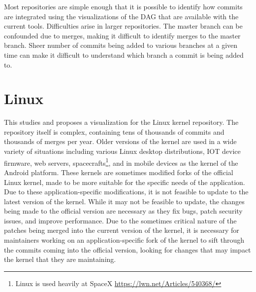 Most repositories are simple enough that it is possible to identify how
commits are integrated using the visualizations of the DAG that are
available with the current tools.
Difficulties arise in larger repositories.
The master branch can be confounded due to \foxtrot{}
merges, making it difficult to identify merges to the master branch.
Sheer number of commits being added to various branches at a given
time can make it difficult to understand which branch a commit is
being added to.

\section{Linux}\label{sec:linux}

This \paper{} studies and proposes a visualization for the Linux kernel
repository.
The repository itself is complex, containing tens of thousands of commits
and thousands of merges per year.
Older versions of the kernel are used in a wide
variety of situations including various Linux desktop distributions,
IOT device firmware, web servers,
spacecrafts\footnote{Linux is used heavily at SpaceX
  \url{https://lwn.net/Articles/540368/}}, and in mobile devices as the
kernel of the Android platform.
These kernels are sometimes modified forks of the official Linux kernel,
made to be more suitable for the specific needs of the application.
Due to these application-specific modifications,
it is not feasible to update to the latest version of the
kernel.
While it may not be feasible to update, the changes being made to the
official version are necessary as they fix bugs, patch security
issues, and improve performance.
Due to the sometimes critical nature of
the patches being merged into the current version of the kernel, it is
necessary for maintainers working on an application-specific fork of the
kernel to sift through the commits coming into the official version,
looking for changes that may impact the kernel that they are
maintaining.


